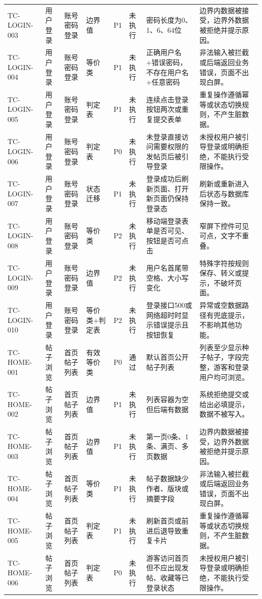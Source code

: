\documentclass[UTF8,zihao=-4]{ctexart}
\begin{document}
{\begin{longtable}{P{1.8cm}P{1.7cm}P{2.2cm}P{1.8cm}P{1cm}P{1.2cm}P{4.1cm}P{5.3cm}}
TC-LOGIN-003 & 用户登录 & 账号密码登录 & 边界值 & P1 & 未执行 & 密码长度为0、1、6、64位 & 边界内数据被接受，边界外数据被拒绝并提示原因。 \\
TC-LOGIN-004 & 用户登录 & 账号密码登录 & 等价类 & P1 & 未执行 & 正确用户名+错误密码，不存在用户名+任意密码 & 非法输入被拦截或后端返回业务错误，页面不出现白屏。 \\
TC-LOGIN-005 & 用户登录 & 账号密码登录 & 判定表 & P1 & 未执行 & 连续点击登录按钮两次或重复提交表单 & 重复操作遵循幂等或状态切换规则，不产生脏数据。 \\
TC-LOGIN-006 & 用户登录 & 账号密码登录 & 判定表 & P0 & 未执行 & 未登录直接访问需要权限的发帖页后被引导登录 & 未授权用户被引导登录或明确拒绝，不能执行受限操作。 \\
TC-LOGIN-007 & 用户登录 & 账号密码登录 & 状态迁移 & P1 & 未执行 & 登录成功后刷新页面、打开新页面仍保持登录态 & 刷新或重新进入后状态与数据库保持一致。 \\
TC-LOGIN-008 & 用户登录 & 账号密码登录 & 等价类 & P2 & 未执行 & 移动端登录表单是否可见、按钮是否可点击 & 窄屏下控件可见可点，文字不重叠。 \\
TC-LOGIN-009 & 用户登录 & 账号密码登录 & 边界值 & P2 & 未执行 & 用户名首尾带空格、大小写变化 & 特殊字符按规则保存、转义或提示，不破坏页面。 \\
TC-LOGIN-010 & 用户登录 & 账号密码登录 & 等价类+判定表 & P2 & 未执行 & 登录接口500或网络超时时显示错误提示且按钮恢复 & 异常或空数据路径有兜底提示，不影响其他功能。 \\
TC-HOME-001 & 帖子浏览 & 首页帖子列表 & 有效等价类 & P0 & 通过 & 默认首页公开帖子列表 & 列表至少显示种子帖子，字段完整，游客和登录用户均可浏览。 \\
TC-HOME-002 & 帖子浏览 & 首页帖子列表 & 边界值 & P1 & 未执行 & 列表容器为空但后端有数据 & 系统拒绝提交或给出必填提示，数据不被写入。 \\
TC-HOME-003 & 帖子浏览 & 首页帖子列表 & 边界值 & P1 & 未执行 & 第一页0条、1条、满页、多页数据 & 边界内数据被接受，边界外数据被拒绝并提示原因。 \\
TC-HOME-004 & 帖子浏览 & 首页帖子列表 & 等价类 & P1 & 未执行 & 帖子数据缺少作者、版块或摘要字段 & 非法输入被拦截或后端返回业务错误，页面不出现白屏。 \\
TC-HOME-005 & 帖子浏览 & 首页帖子列表 & 判定表 & P1 & 未执行 & 刷新首页或前进后退导致重复卡片 & 重复操作遵循幂等或状态切换规则，不产生脏数据。 \\
TC-HOME-006 & 帖子浏览 & 首页帖子列表 & 判定表 & P0 & 未执行 & 游客访问首页但不应出现发帖、收藏等已登录状态 & 未授权用户被引导登录或明确拒绝，不能执行受限操作。 \\

\end{longtable}}
\end{document}
